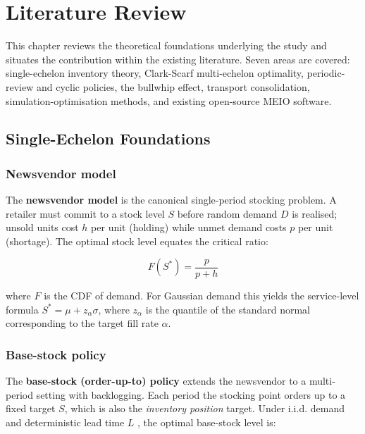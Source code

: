 \chapter{Literature Review}
\label{chap:litreview}

This chapter reviews the theoretical foundations underlying the study and
situates the contribution within the existing literature.  Seven areas
are covered: single-echelon inventory theory, Clark-Scarf multi-echelon
optimality, periodic-review and cyclic policies, the bullwhip effect,
transport consolidation, simulation-optimisation methods, and existing
open-source MEIO software.

\section{Single-Echelon Foundations}
\label{sec:lit:singleechelon}

\subsection{Newsvendor model}

The \textbf{newsvendor model} \citep{ArrowHarrisMarschak1951} is the
canonical single-period stocking problem.  A retailer must commit to a
stock level $S$ before random demand $D$ is realised; unsold units cost
$h$ per unit (holding) while unmet demand costs $p$ per unit (shortage).
The optimal stock level equates the critical ratio:

\begin{equation}
  F(S^*) = \frac{p}{p + h}
  \label{eq:newsvendor-crit}
\end{equation}

where $F$ is the CDF of demand.  For Gaussian demand this yields the
service-level formula $S^* = \mu + z_\alpha \sigma$, where $z_\alpha$ is
the quantile of the standard normal corresponding to the target fill rate
$\alpha$.

\subsection{Base-stock policy}

The \textbf{base-stock (order-up-to) policy} extends the newsvendor to a
multi-period setting with backlogging.  Each period the stocking point
orders up to a fixed target $S$, which is also the \emph{inventory
position} target.  Under i.i.d. demand and deterministic lead time $L$
\citep{Zipkin2000}, the optimal base-stock level is:

